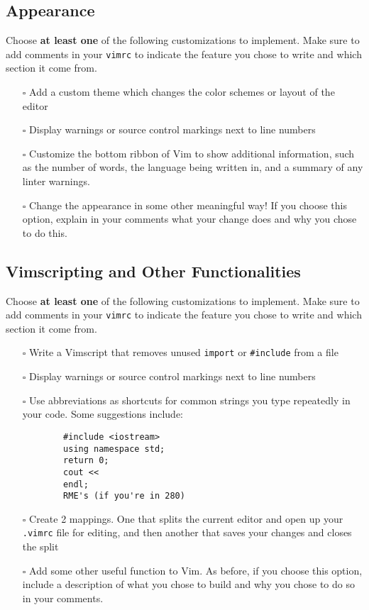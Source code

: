 \documentclass{article}
\begin{document}
\subsection{Appearance}
Choose \textbf{at least one} of the following customizations to implement. Make sure to add comments in your
\texttt{vimrc} to indicate the feature you chose to write and which section it come from.
\begin{itemize}
  \item[$\square$] Add a custom theme which changes the color schemes or layout of the editor
  \item[$\square$] Display warnings or source control markings next to line numbers
  \item[$\square$] Customize the bottom ribbon of Vim to show additional information, such as the number of words, the
      language being written in, and a summary of any linter warnings.
  \item[$\square$] Change the appearance in some other meaningful way! If you choose this option, explain in your
      comments what your change does and why you chose to do this.
\end{itemize}

\subsection{Vimscripting and Other Functionalities}
Choose \textbf{at least one} of the following customizations to implement. Make sure to add comments in your
\texttt{vimrc} to indicate the feature you chose to write and which section it come from.
\begin{itemize}
    \item[$\square$] Write a Vimscript that removes unused \texttt{import} or \texttt{#include} from a file
  \item[$\square$] Display warnings or source control markings next to line numbers
  \item[$\square$] Use abbreviations as shortcuts for common strings you type repeatedly in your code. Some suggestions
      include:

      \begin{lstlisting}
        #include <iostream>
        using namespace std;
        return 0;
        cout <<
        endl;
        RME's (if you're in 280)
      \end{lstlisting}
  
  \item[$\square$] Create 2 mappings. One that splits the current editor and open up your \texttt{.vimrc} file for editing, and then another that saves your changes and closes the split
  \item[$\square$] Add some other useful function to Vim. As before, if you choose this option, include a description of
      what you chose to build and why you chose to do so in your comments.
\end{itemize}
\end{document}
